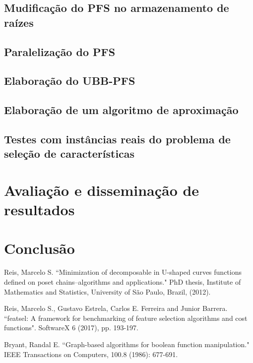 \documentclass[12pt]{article}
\begin{document}
\subsection{Mudificação do PFS no armazenamento de raízes}
\subsection{Paralelização do PFS}
\subsection{Elaboração do UBB-PFS}
\subsection{Elaboração de um algoritmo de aproximação}
\subsection{Testes com instâncias reais do problema de seleção de 
            características}
\section{Avaliação e disseminação de resultados}
\section{Conclusão}
\pagebreak


\begin{thebibliography}{9} \label{sec:referencias}


Reis, Marcelo S. ``Minimization of decomposable in U-shaped curves functions defined on poset chains–algorithms and applications." PhD thesis, Institute of Mathematics and Statistics, University of São Paulo, Brazil, (2012).

Reis, Marcelo S., Gustavo Estrela, Carlos E. Ferreira and Junior Barrera.
``featsel: A framework for benchmarking of feature selection algorithms
and cost functions". SoftwareX 6 (2017), pp. 193-197.

Bryant, Randal E. ``Graph-based algorithms for boolean function manipulation." IEEE Transactions on Computers, 100.8 (1986): 677-691. 


\end{thebibliography}
\end{document}

